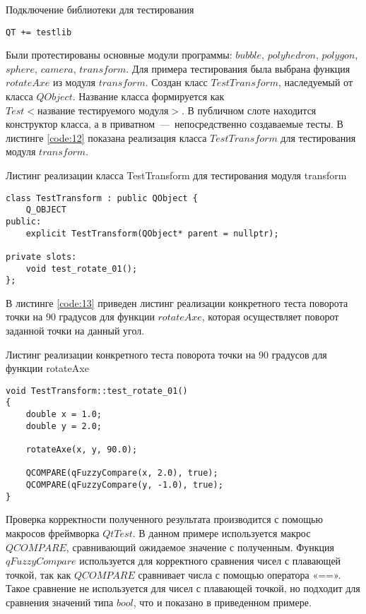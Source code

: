 \begin{code}
\caption{Подключение библиотеки для тестирования}
\label{code:11}
\begin{verbatim}
QT += testlib
\end{verbatim}
\end{code}

Были протестированы основные модули программы: $bubble$, $polyhedron$, $polygon$, $sphere$, $camera$, $transform$. Для примера тестирования была выбрана функция $rotateAxe$ из модуля $transform$. Создан класс $TestTransform$, наследуемый от класса $QObject$. Название класса формируется как $Test<\text{название тестируемого модуля}>$. В публичном слоте находится конструктор класса, а в приватном~---~непосредственно создаваемые тесты. В листинге \ref{code:12} показана реализация класса $TestTransform$ для тестирования модуля $transform$.

\newpage

\begin{code}
\caption{Листинг реализации класса TestTransform для тестирования модуля transform}
\label{code:12}
\begin{verbatim}
class TestTransform : public QObject {
    Q_OBJECT
public:
    explicit TestTransform(QObject* parent = nullptr);

private slots:
    void test_rotate_01();
};
\end{verbatim}
\end{code}

В листинге \ref{code:13} приведен листинг реализации конкретного теста поворота точки на 90 градусов для функции $rotateAxe$, которая осуществляет поворот заданной точки на данный угол. 

\begin{code}
\caption{Листинг реализации конкретного теста поворота точки на 90 градусов для функции rotateAxe}
\label{code:13}
\begin{verbatim}
void TestTransform::test_rotate_01()
{
    double x = 1.0;
    double y = 2.0;

    rotateAxe(x, y, 90.0);

    QCOMPARE(qFuzzyCompare(x, 2.0), true);
    QCOMPARE(qFuzzyCompare(y, -1.0), true);
}
\end{verbatim}
\end{code}

Проверка корректности полученного результата производится с помощью макросов фреймворка $Qt Test$. В данном примере используется макрос $QCOMPARE$, сравнивающий ожидаемое значение с полученным. Функция $qFuzzyCompare$ используется для корректного сравнения чисел с плавающей точкой, так как $QCOMPARE$ сравнивает числа с помощью оператора «==». Такое сравнение не используется для чисел с плавающей точкой, но подходит для сравнения значений типа $bool$, что и показано в приведенном примере.


